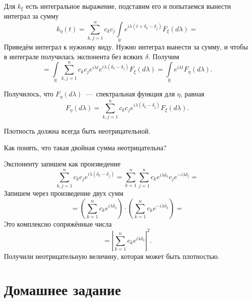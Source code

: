 Для $k_{ \xi }$ есть интегральное выражение, подставим его и попытаемся вынести интеграл за сумму
\begin{equation*}
  k_{ \eta } \left( t \right) =
  \sum \limits_{k, j = 1}^n
    c_k c_j \int \limits_{ \mathbb{R}}
      e^{i \lambda \left( t + \delta_k - \delta_j \right) } F_{ \xi } \left( d \lambda \right) =
\end{equation*}
Приведём интеграл к нужному виду.
Нужно интеграл вынести за сумму, и чтобы в интеграле получилась экспонента без всяких $ \delta $.
Получим
\begin{equation*}
  = \int \limits_{ \mathbb{R}}
      \sum \limits_{k, j = 1}^n
        c_k c_j e^{i \lambda t} e^{i \lambda \left( \delta_k - \delta_j \right) }
    F_{ \xi } \left( d \lambda \right) =
  \int \limits_{ \mathbb{R}} e^{i \lambda t} F_{ \eta } \left( d \lambda \right).
\end{equation*}

Получилось, что $F_{ \eta } \left( d \lambda \right) $~---~спектральная функция для $ \eta $, равная
\begin{equation*}
  F_{ \eta } \left( d \lambda \right) =
  \sum \limits_{k, j = 1}^n
    c_k c_j e^{i \lambda \left( \delta_k - \delta_j \right) } F_{ \xi } \left( d \lambda \right).
\end{equation*}

Плотность должна всегда быть неотрицательной.

Как понять, что такая двойная сумма неотрицательна?

Экспоненту запишем как произведение
\begin{equation*}
  \sum \limits_{k, j = 1}^n c_k c_j e^{i \lambda \left( \delta_k - \delta_j \right) } =
  \sum \limits_{k = 1}^n
    \sum \limits_{j = 1}^n c_k e^{i \lambda \delta_k} c_j e^{-i \lambda \delta_j} =
\end{equation*}
Запишем через произведение двух сумм
\begin{equation*}
  = \left( \sum \limits_{k = 1}^n c_k e^{i \lambda \delta_k} \right) \cdot
  \left( \sum \limits_{k = 1}^n c_k e^{-i \lambda \delta_k} \right) =
\end{equation*}
Это комплексно сопряжённые числа
\begin{equation*}
  = \left| \sum \limits_{k = 1}^n c_k e^{i \lambda \delta_k} \right|^2.
\end{equation*}
Получили неотрицательную величину, которая может быть плотностью.

\section*{Домашнее задание}

